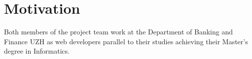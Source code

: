 \section{Motivation}
Both members of the project team work at the Department of Banking and Finance UZH as web developers parallel to their studies achieving their Master’s degree in Informatics.
